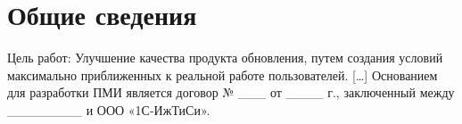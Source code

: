 \section{Общие сведения}


Цель работ: Улучшение качества продукта обновления, путем создания условий максимально приближенных к реальной работе пользователей.
[…]
Основанием для разработки ПМИ является договор № \_\_\_ от \_\_\_\_ г., заключенный между \_\_\_\_\_\_\_\_ и ООО «1С-ИжТиСи».